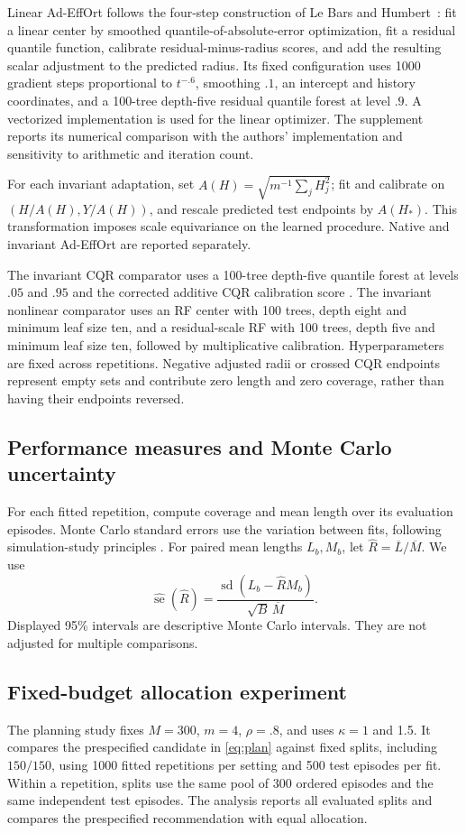 \documentclass[nolineno]{ieeeaccess}
\newcommand{\se}{\operatorname{se}}
\begin{document}
Linear Ad-EffOrt follows the four-step construction of Le Bars and Humbert~\cite{bars2025}: fit a linear center by smoothed quantile-of-absolute-error optimization, fit a residual quantile function, calibrate residual-minus-radius scores, and add the resulting scalar adjustment to the predicted radius. Its fixed configuration uses 1000 gradient steps proportional to $t^{-.6}$, smoothing $.1$, an intercept and history coordinates, and a 100-tree depth-five residual quantile forest at level $.9$. A vectorized implementation is used for the linear optimizer. The supplement reports its numerical comparison with the authors' implementation and sensitivity to arithmetic and iteration count.

For each invariant adaptation, set $A(H)=\sqrt{m^{-1}\sum_jH_j^2}$; fit and calibrate on $(H/A(H),Y/A(H))$, and rescale predicted test endpoints by $A(H_*)$. This transformation imposes scale equivariance on the learned procedure. Native and invariant Ad-EffOrt are reported separately.

The invariant CQR comparator uses a 100-tree depth-five quantile forest at levels $.05$ and $.95$ and the corrected additive CQR calibration score \cite{romano2019}. The invariant nonlinear comparator uses an RF center with 100 trees, depth eight and minimum leaf size ten, and a residual-scale RF with 100 trees, depth five and minimum leaf size ten, followed by multiplicative calibration. Hyperparameters are fixed across repetitions. Negative adjusted radii or crossed CQR endpoints represent empty sets and contribute zero length and zero coverage, rather than having their endpoints reversed.

\subsection{Performance measures and Monte Carlo uncertainty}
For each fitted repetition, compute coverage and mean length over its evaluation episodes. Monte Carlo standard errors use the variation between fits, following simulation-study principles \cite{morris2019}. For paired mean lengths $L_b,M_b$, let $\widehat R=\overline L/\overline M$. We use
\begin{equation}
\widehat{\se}(\widehat R)=
\frac{\operatorname{sd}(L_b-\widehat R M_b)}
{\sqrt{B}\,\overline M}.
\label{eq:ratiose}
\end{equation}
Displayed 95\% intervals are descriptive Monte Carlo intervals. They are not adjusted for multiple comparisons.

\subsection{Fixed-budget allocation experiment}
The planning study fixes $M=300$, $m=4$, $\rho=.8$, and uses $\kappa=1$ and 1.5. It compares the prespecified candidate in \eqref{eq:plan} against fixed splits, including $150/150$, using 1000 fitted repetitions per setting and 500 test episodes per fit. Within a repetition, splits use the same pool of 300 ordered episodes and the same independent test episodes. The analysis reports all evaluated splits and compares the prespecified recommendation with equal allocation.
\end{document}

